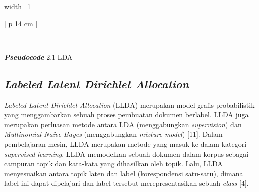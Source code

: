 \begin{table}[H]
\footnotesize
\begin{adjustbox}{width=1\textwidth}
\begin{tabular}{| p {14 cm}  |}
\hline
{} \\
\hline
\end{tabular}
\end{adjustbox}
\\[1.5pt]
\begin{center}\small{{\itshape {\bfseries Pseudocode}} 2.1 LDA}\end{center}
\end{table}

\subsection{{\itshape Labeled Latent Dirichlet Allocation}}
\indent
{\itshape Labeled Latent Dirichlet Allocation} (LLDA) merupakan model grafis probabilistik yang menggambarkan sebuah proses pembuatan dokumen berlabel. LLDA juga merupakan perluasan metode antara LDA (menggabungkan {\itshape supervision}) dan {\itshape Multinomial Naïve Bayes} (menggabungkan {\itshape mixture model}) [11]. Dalam pembelajaran mesin, LLDA merupakan metode yang masuk ke dalam kategori {\itshape supervised learning}. LLDA memodelkan sebuah dokumen dalam korpus sebagai campuran topik dan kata-kata yang dihasilkan oleh topik. Lalu, LLDA menyesuaikan antara topik laten dan label (korespondensi satu-satu), dimana label ini dapat dipelajari dan label tersebut merepresentasikan sebuah {\itshape class} [4].

